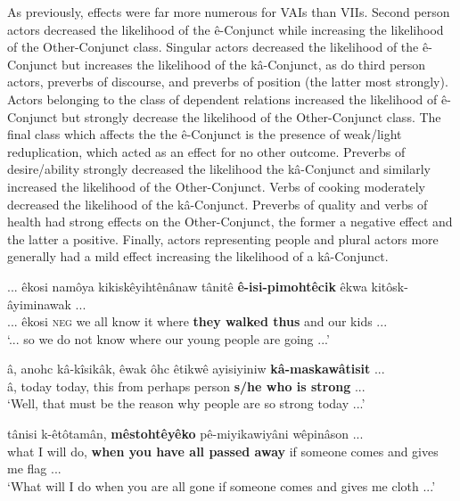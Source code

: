                 
As previously, effects were far more numerous for VAIs than VIIs. Second person actors decreased the likelihood of the ê-Conjunct while increasing the likelihood of the Other-Conjunct class. Singular actors decreased the likelihood of the ê-Conjunct but increases the likelihood of the kâ-Conjunct, as do third person actors, preverbs of discourse, and preverbs of position (the latter most strongly). Actors belonging to the class of dependent relations increased the likelihood of ê-Conjunct but strongly decrease the likelihood of the Other-Conjunct class. The final class which affects the the ê-Conjunct is the presence of weak/light reduplication, which acted as an effect for no other outcome. Preverbs of desire/ability strongly decreased the likelihood the kâ-Conjunct and similarly increased the likelihood of the Other-Conjunct. Verbs of cooking moderately decreased the likelihood of the kâ-Conjunct. Preverbs of quality and verbs of health had strong effects on the Other-Conjunct, the former a negative effect and the latter a positive. Finally, actors representing people and plural actors more generally had a mild effect increasing the likelihood of a kâ-Conjunct.


    \begin{exe}
    \ex
    \gll ... êkosi namôya kikiskêyihtênânaw tânitê \textbf{ê-isi-pimohtêcik} êkwa kitôsk-âyiminawak ...\\
         ... êkosi \textsc{neg} {we all know it} where {\textbf{they walked thus}} and {our kids} ... \\
    \trans `... so we do not know where our young people are going ...' \citep[42-43]{VandallDouquette1987}
    \label{cnjtypeai}
    \end{exe}

    \begin{exe}
    \ex
    \gll â, anohc kâ-kîsikâk, êwak ôhc êtikwê ayisiyiniw \textbf{kâ-maskawâtisit} ... \\
         â, today today,      this from perhaps person {\textbf{s/he who is strong}} ...\\
    \trans `Well, that must be the reason why people are so strong today ...' \citep[364]{Bearetal1992}
    \label{cnjtypeai2}
    \end{exe}


    \begin{exe}
    \ex
    \gll tânisi k-êtôtamân, \textbf{mêstohtêyêko} pê-miyikawiyâni wêpinâson ...\\
         what   {I will do}, {\textbf{when you have all passed away}} {if someone comes and gives me} flag ... \\
    \trans `What will I do when you are all gone if someone comes and gives me cloth ...' \citep[128]{Bearetal1992}
    \label{cnjtypeai3}
    \end{exe}

